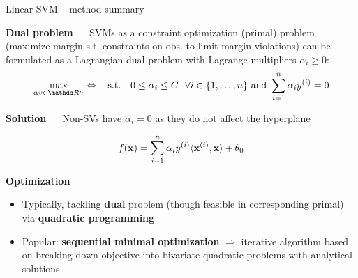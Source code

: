 \documentclass[11pt,compress,t,notes=noshow, xcolor=table]{beamer}
\newcommand{\highlight}[1]{\textcolor{hlcol}{\textbf{#1}}}
\begin{document}
\begin{frame2}{Linear SVM -- method summary}

\highlight{Dual problem} ~~ %
SVMs as a constraint optimization (primal) problem (maximize margin s.t. constraints on obs. to limit margin violations) can be formulated as a Lagrangian dual problem with Lagrange multipliers $\alpha_i \geq 0$: %
$$\max\limits_{\alpha v \in \R^n} \Leftrightarrow \;\; \text{ s.t. } \;\; 0 \le \alpha_i \le C ~~ \forall i \in \nset \text{ and } \sum_{i=1}^n \alpha_i \yi = 0$$


\highlight{Solution} ~~ 
Non-SVs have $\alpha_i = 0$ as they do not affect the hyperplane

$$f(\mathbf{x}) = \sum\limits_{i=1}^n \alpha_i y^{(i)} \langle \mathbf{x}^{(i)}, \mathbf{x} \rangle  + \theta_0$$


\highlight{Optimization}

\begin{itemize}
\item Typically, tackling \textbf{dual} problem (though feasible 
in corresponding primal) via \textbf{quadratic programming}
\item Popular: \textbf{sequential minimal optimization} $\Rightarrow$ 
iterative algorithm based on breaking down objective into bivariate quadratic 
problems with analytical solutions
\end{itemize}

\end{frame2}
\end{document}
